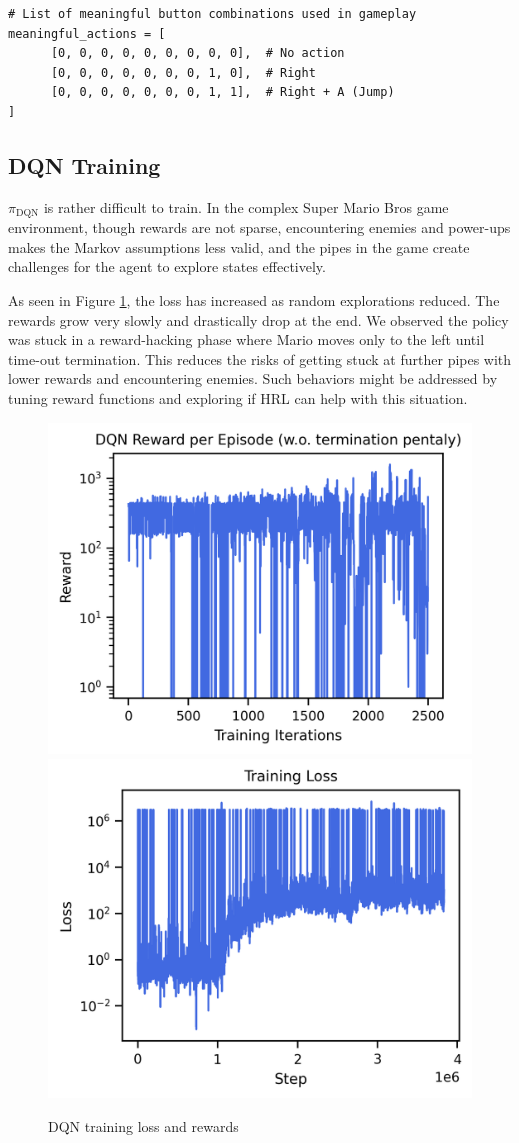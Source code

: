 \documentclass{article}
\begin{document}
\begin{verbatim}
# List of meaningful button combinations used in gameplay
meaningful_actions = [
      [0, 0, 0, 0, 0, 0, 0, 0, 0],  # No action
      [0, 0, 0, 0, 0, 0, 0, 1, 0],  # Right
      [0, 0, 0, 0, 0, 0, 0, 1, 1],  # Right + A (Jump)
]
\end{verbatim}

\subsection{DQN Training}
\label{a2:dqn}

$\pi_{\text{DQN}}$ is rather difficult to train. In the 
complex Super Mario Bros game environment, though rewards are not sparse, encountering enemies 
and power-ups makes the Markov assumptions less valid, and the pipes in the 
game create challenges for the agent to explore states effectively.

As seen in Figure \ref{figa:dqn}, the loss has increased as random explorations 
reduced. The rewards grow very slowly and drastically drop at the end. We 
observed the policy was stuck in a reward-hacking phase where Mario moves only 
to the left until time-out termination. This reduces the risks of getting stuck 
at further pipes with lower rewards and encountering enemies. Such behaviors 
might be addressed by tuning reward functions and exploring if HRL can help 
with this situation.

\begin{figure}[htbp]
\centering
\includegraphics[width=0.45\columnwidth]{figures/dqn_rewards.png}
\hspace{0.5cm} %
\includegraphics[width=0.45\columnwidth]{figures/dqn_loss.png}
\caption{DQN training loss and rewards}
\label{figa:dqn}
\end{figure}
\end{document}

